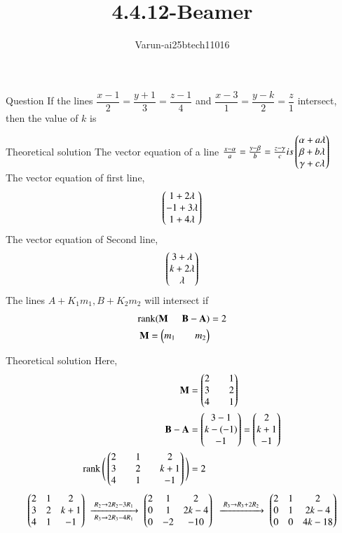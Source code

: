 \documentclass{beamer}
\title %
{4.4.12-Beamer}
\author %
{Varun-ai25btech11016}
\begin{document}
\frame{\titlepage}
\begin{frame}{Question}
If the lines $\dfrac{x-1}{2} = \dfrac{y+1}{3} = \dfrac{z-1}{4}$ 
and $\dfrac{x-3}{1} = \dfrac{y-k}{2} = \dfrac{z}{1}$ intersect, 
then the value of $k$ is

\end{frame}
\begin{frame}{Theoretical solution}
The vector equation of a line $\tfrac{x-\alpha}{a}=\tfrac{y-\beta}{b}=\tfrac{z-\gamma}{c}  is \begin{pmatrix}\alpha+a\lambda\\\beta+b\lambda\\\gamma+c\lambda\end{pmatrix}$\\
The vector equation of first line,
\begin{align}
\begin{pmatrix}1+2\lambda\\-1+3\lambda\\1+4\lambda\end{pmatrix}
\end{align}
The vector equation of Second line,
\begin{align}
\begin{pmatrix}3+\lambda\\k+2\lambda\\\lambda\end{pmatrix}
\end{align}
The lines $A+ K_1m_1,B+K_2m_2$ will intersect if 
\begin{align}
\operatorname{rank}(\mathbf{M} \hspace{5mm}  \mathbf{B-A})&=2\\
\mathbf{M}=\begin{pmatrix}m_1&&m_2\end{pmatrix}
\end{align}
\end{frame}
\begin{frame}{Theoretical solution}
Here,
\begin{align}
\mathbf{M}&=\begin{pmatrix}2&&1\\3&&2\\4&&1\end{pmatrix}\\
\mathbf{B-A}&=\begin{pmatrix}3-1\\k-(-1)\\-1\end{pmatrix}=\begin{pmatrix}2\\k+1\\-1\end{pmatrix}\\
\operatorname{rank}\Bigg(\begin{pmatrix}2&&1&&2\\3&&2&&k+1\\4&&1&&-1\end{pmatrix}\Bigg)&=2
\end{align}
\[
\begin{pmatrix}
2 & 1 & 2\\
3 & 2 & k+1\\
4 & 1 & -1
\end{pmatrix}
\;\xrightarrow[\;R_3 \to 2R_3 - 4R_1\;]{\;R_2 \to 2R_2 - 3R_1\;}\;
\begin{pmatrix}
2 & 1 & 2\\
0 & 1 & 2k-4\\
0 & -2 & -10
\end{pmatrix}\\
\;\xrightarrow[\;]{\;R_3 \to R_3 + 2R_2\;}\;
\begin{pmatrix}
2 & 1 & 2\\
0 & 1 & 2k-4\\
0 & 0 & 4k-18
\end{pmatrix}
\]
\end{frame}
\end{document}
